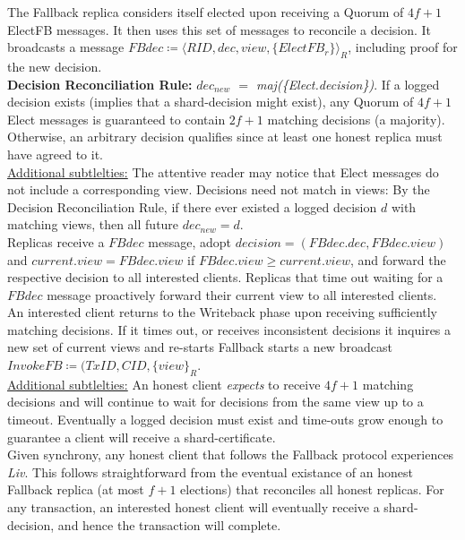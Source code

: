The Fallback replica considers itself elected upon receiving a Quorum of $4f+1$ ElectFB messages. It then uses this set of messages to reconcile a decision. It broadcasts a message $FBdec \coloneqq \langle RID, dec, view, \{ElectFB_r\} \rangle_R$, including proof for the new decision. \\
\textbf{Decision Reconciliation Rule:} \textit{$dec_{new}$ $=$ maj(\{Elect.decision\})}. If a logged decision exists (implies that a shard-decision might exist), any Quorum of $4f+1$ Elect messages is guaranteed to contain $2f+1$ matching decisions (a majority). Otherwise, an arbitrary decision qualifies since at least one honest replica must have agreed to it.\\
\underline{Additional subtlelties:} The attentive reader may notice that Elect messages do not include a corresponding view. Decisions need not match in views: By the Decision Reconciliation Rule, if there ever existed a logged decision $d$ with matching views, then all future $dec_{new} = d$.\\
Replicas receive a $FBdec$ message, adopt $decision = (FBdec.dec, FBdec.view)$ and $current.view = FBdec.view$ if $FBdec.view \geq current.view$, and forward the respective decision to all interested clients. Replicas that time out waiting for a $FBdec$ message proactively forward their current view to all interested clients. \\
An interested client returns to the Writeback phase upon receiving sufficiently matching decisions. If it times out, or receives inconsistent decisions it inquires a new set of current views and re-starts Fallback starts a new broadcast $InvokeFB \coloneqq (TxID, CID, \{view\}_R$.\\
\underline{Additional subtlelties:} An honest client \textit{expects} to receive $4f+1$ matching decisions and will continue to wait for decisions from the same view up to a timeout. Eventually a logged decision must exist and time-outs grow enough to guarantee a client will receive a shard-certificate. \\
Given synchrony, any honest client that follows the Fallback protocol experiences \textit{Liv}. This follows straightforward from the eventual existance of an honest Fallback replica (at most $f+1$ elections) that reconciles all honest replicas. For any transaction, an interested honest client will eventually receive a shard-decision, and hence the transaction will complete.

